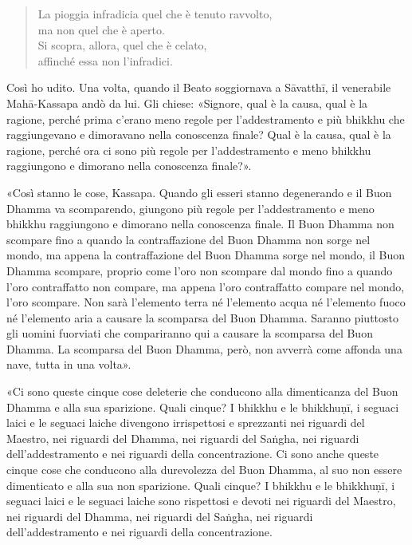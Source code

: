 \begin{quote}
La pioggia infradicia quel che è tenuto ravvolto, \\
ma non quel che è aperto. \\
Si scopra, allora, quel che è celato, \\
affinché essa non l’infradici.
\end{quote}



 Così ho udito. Una volta, quando il Beato soggiornava a
Sāvatthī, il venerabile Mahā-Kassapa andò da lui. Gli chiese: «Signore,
qual è la causa, qual è la ragione, perché prima c’erano meno regole per
l’addestramento e più bhikkhu che raggiungevano e dimoravano nella
conoscenza finale? Qual è la causa, qual è la ragione, perché ora ci
sono più regole per l’addestramento e meno bhikkhu raggiungono e
dimorano nella conoscenza finale?».


«Così stanno le cose, Kassapa. Quando gli esseri stanno degenerando e il
Buon Dhamma va scomparendo, giungono più regole per l’addestramento e
meno bhikkhu raggiungono e dimorano nella conoscenza finale. Il Buon
Dhamma non scompare fino a quando la contraffazione del Buon Dhamma non
sorge nel mondo, ma appena la contraffazione del Buon Dhamma sorge nel
mondo, il Buon Dhamma scompare, proprio come l’oro non scompare dal
mondo fino a quando l’oro contraffatto non compare, ma appena l’oro
contraffatto compare nel mondo, l’oro scompare. Non sarà l’elemento
terra né l’elemento acqua né l’elemento fuoco né l’elemento aria a
causare la scomparsa del Buon Dhamma. Saranno piuttosto gli uomini
fuorviati che compariranno qui a causare la scomparsa del Buon Dhamma.
La scomparsa del Buon Dhamma, però, non avverrà come affonda una nave,
tutta in una volta».


«Ci sono queste cinque cose deleterie che conducono alla dimenticanza
del Buon Dhamma e alla sua sparizione. Quali cinque? I bhikkhu e le
bhikkhuṇī, i seguaci laici e le seguaci laiche divengono irrispettosi e
sprezzanti nei riguardi del Maestro, nei riguardi del Dhamma, nei
riguardi del Saṅgha, nei riguardi dell’addestramento e nei riguardi
della concentrazione. Ci sono anche queste cinque cose che conducono
alla durevolezza del Buon Dhamma, al suo non essere dimenticato e alla
sua non sparizione. Quali cinque? I bhikkhu e le bhikkhuṇī, i seguaci
laici e le seguaci laiche sono rispettosi e devoti nei riguardi del
Maestro, nei riguardi del Dhamma, nei riguardi del Saṅgha, nei riguardi
dell’addestramento e nei riguardi della concentrazione.


